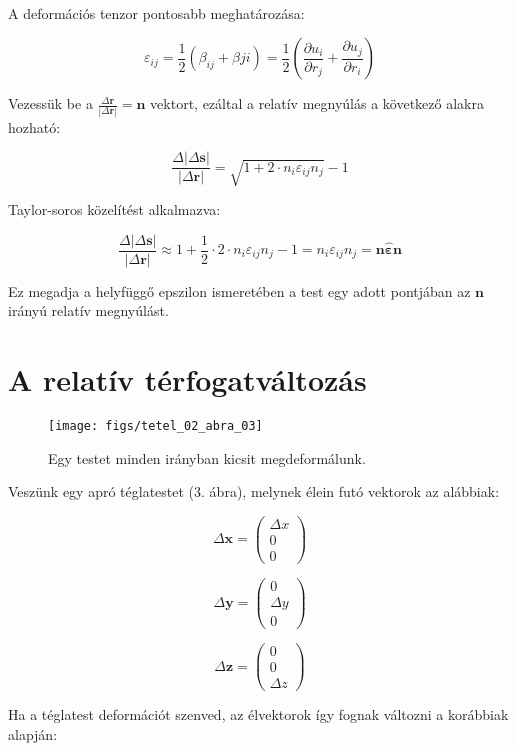 \documentclass[a4paper, 12pt]{article}
\begin{document}
~

A deformációs tenzor pontosabb meghatározása:

$$\varepsilon_{ij}=\frac12(\beta_{ij}+\beta{ji})=\frac12\left(\frac{\partial u_i}{\partial r_j}+\frac{\partial u_j}{\partial r_i}\right)$$

Vezessük be a $\frac{\Delta\mathbf{r}}{|\Delta\mathbf{r}|}=\mathbf{n}$ vektort, ezáltal a relatív megnyúlás a következő alakra hozható:

$$\frac{\Delta|\Delta\mathbf{s}|}{|\Delta\mathbf{r}|}=\sqrt{1+2\cdot n_i\varepsilon_{ij}n_j}-1$$

Taylor-soros közelítést alkalmazva:

$$\frac{\Delta|\Delta\mathbf{s}|}{|\Delta\mathbf{r}|}\approx 1+\frac12\cdot 2\cdot n_i\varepsilon_{ij}n_j-1=n_i\varepsilon_{ij}n_j=\mathbf{n}\mathbf{\hat\varepsilon}\mathbf{n}$$

Ez megadja a helyfüggő epszilon ismeretében a test egy adott pontjában az $\mathbf{n}$ irányú relatív megnyúlást.


\part*{\Large{A relatív térfogatváltozás}}

\begin{figure}[htbp]
\centering
\texttt{[image: figs/tetel\_02\_abra\_03]}
\caption{Egy testet minden irányban kicsit megdeformálunk.}
\end{figure}

Veszünk egy apró téglatestet (3. ábra), melynek élein futó vektorok az alábbiak:

$$\Delta\mathbf{x}= \left( \begin{array}{c} \Delta x\\0\\0\end{array}\right)$$

$$\Delta\mathbf{y}= \left( \begin{array}{c} 0\\ \Delta y\\0\end{array}\right)$$

$$\Delta\mathbf{z}= \left( \begin{array}{c} 0\\0\\\Delta z\end{array}\right)$$

Ha a téglatest deformációt szenved, az élvektorok így fognak változni a korábbiak alapján:
\end{document}
